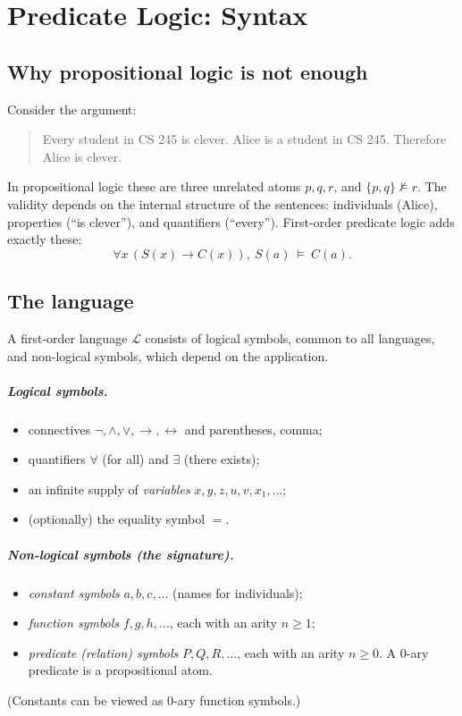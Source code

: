 \chapter{Predicate Logic: Syntax}\label{ch:predsyntax}

\section{Why propositional logic is not enough}

Consider the argument:
\begin{quote}
Every student in CS 245 is clever. Alice is a student in CS 245. Therefore Alice is clever.
\end{quote}
In propositional logic these are three unrelated atoms $p,q,r$, and $\{p,q\}\not\models r$.
The validity depends on the internal structure of the sentences: individuals (Alice),
properties (``is clever''), and quantifiers (``every''). First-order predicate logic adds
exactly these:
\[
  \forall x\,(S(x)\to C(x)),\ S(a)\ \models\ C(a).
\]

\section{The language}

A first-order language $\mathcal{L}$ consists of logical symbols, common to all
languages, and non-logical symbols, which depend on the application.

\paragraph{Logical symbols.}
\begin{itemize}
  \item connectives $\neg,\land,\lor,\to,\leftrightarrow$ and parentheses, comma;
  \item quantifiers $\forall$ (for all) and $\exists$ (there exists);
  \item an infinite supply of \emph{variables} $x,y,z,u,v,x_1,\dots$;
  \item (optionally) the equality symbol $=$.
\end{itemize}

\paragraph{Non-logical symbols (the signature).}
\begin{itemize}
  \item \emph{constant symbols} $a,b,c,\dots$ (names for individuals);
  \item \emph{function symbols} $f,g,h,\dots$, each with an arity $n\ge1$;
  \item \emph{predicate (relation) symbols} $P,Q,R,\dots$, each with an arity $n\ge 0$.
        A $0$-ary predicate is a propositional atom.
\end{itemize}
(Constants can be viewed as $0$-ary function symbols.)

